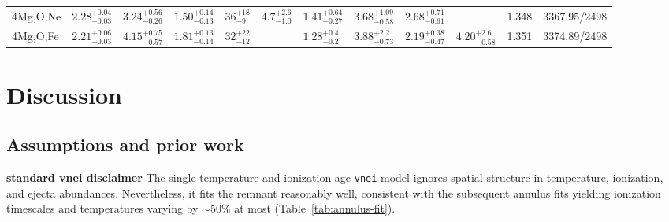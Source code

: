 \documentclass[preprint2,tighten,trackchanges]{aastex6}
\newcommand*{\abt}{\mathord{\sim}} %
\begin{document}
\begin{table*}[!ht]
\begin{tabular}{@{}lllllllllllr@{}}
\midrule

4Mg,O,Ne& ${2.28}^{+0.04}_{-0.03}$ & ${3.24}^{+0.56}_{-0.26}$ & ${1.50}^{+0.14}_{-0.13}$
    & ${36}^{+18}_{-9}$ & ${4.7}^{+2.6}_{-1.0}$ & ${1.41}^{+0.64}_{-0.27}$ & ${3.68}^{+1.09}_{-0.58}$ & ${2.68}^{+0.71}_{-0.61}$ &
    & 1.348 & 3367.95/2498 \\

4Mg,O,Fe  & ${2.21}^{+0.06}_{-0.03}$ & ${4.15}^{+0.75}_{-0.57}$ & ${1.81}^{+0.13}_{-0.14}$
    & ${32}^{+22}_{-12}$ &                 & ${1.28}^{+0.4}_{-0.2}$ & ${3.88}^{+2.2}_{-0.73}$ & ${2.19}^{+0.38}_{-0.47}$ & ${4.20}^{+2.6}_{-0.58}$
    & 1.351 & 3374.89/2498 \\

\bottomrule
\end{tabular}
\end{table*}

\begin{figure*}[!ht]
    \label{fig:annuli-varycenter-spectra}
\end{figure*}



\section{Discussion}

\subsection{Assumptions and prior work}

\textbf{standard vnei disclaimer}
The single temperature and ionization age \texttt{vnei} model ignores spatial
structure in temperature, ionization, and ejecta abundances.
Nevertheless, it fits the remnant reasonably well, consistent with the
subsequent annulus fits yielding ionization timescales and temperatures varying
by $\abt50\%$ at most (Table~\ref{tab:annulus-fit}).
\end{document}
